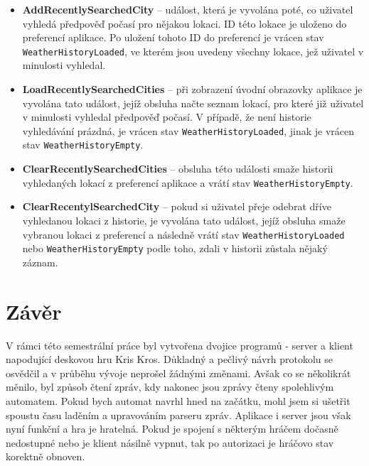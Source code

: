\documentclass[12pt, a4paper]{article}
\let\oldsection\section
\renewcommand\section{\clearpage\oldsection}
\begin{document}
\begin{itemize}

	\item \textbf{AddRecentlySearchedCity} -- událost, která je vyvolána poté, co uživatel vyhledá předpověď počasí pro nějakou lokaci. ID této lokace je uloženo do preferencí aplikace. Po uložení tohoto ID do preferencí je vrácen stav \texttt{WeatherHistoryLoaded}, ve kterém jsou uvedeny všechny lokace, jež uživatel v minulosti vyhledal.

	\item \textbf{LoadRecentlySearchedCities} -- při zobrazení úvodní obrazovky aplikace je vyvolána tato událost, jejíž obsluha načte seznam lokací, pro které již uživatel v minulosti vyhledal předpověď počasí. V případě, že není historie vyhledávání prázdná, je vrácen stav \texttt{WeatherHistoryLoaded}, jinak je vrácen stav \texttt{WeatherHistoryEmpty}.

	\item \textbf{ClearRecentlySearchedCities} -- obsluha této události smaže historii vyhledaných lokací z preferencí aplikace a vrátí stav \texttt{WeatherHistoryEmpty}.

	\item \textbf{ClearRecentylSearchedCity} -- pokud si uživatel přeje odebrat dříve vyhledanou lokaci z historie, je vyvolána tato událost, jejíž obsluha smaže vybranou lokaci z preferencí a následně vrátí stav \texttt{WeatherHistoryLoaded} nebo \texttt{WeatherHistoryEmpty} podle toho, zdali v historii zůstala nějaký záznam.


\end{itemize}


\section{Závěr}
    V rámci této semestrální práce byl vytvořena dvojice programů - server a klient napodující deskovou hru Kris Kros. Důkladný a pečlivý návrh protokolu se osvědčil a v průběhu vývoje neprošel žádnými změnami. Avšak co se několikrát měnilo, byl způsob čtení zpráv, kdy nakonec jsou zprávy čteny spolehlivým automatem. Pokud bych automat navrhl hned na začátku, mohl jsem si ušetřit spoustu času laděním a upravováním parseru zpráv. Aplikace i server jsou však nyní funkční a hra je hratelná. Pokud je spojení s některým hráčem dočasně nedostupné nebo je klient násilně vypnut, tak po autorizaci je hráčovo stav korektně obnoven.
    



	
	
\end{document}
